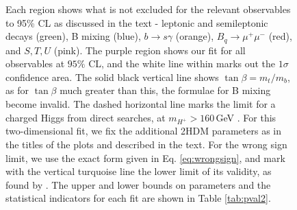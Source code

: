 \documentclass[a4paper,12pt]{article}
\begin{document}
\begin{figure}[H]
{    Each region shows what is not excluded for the relevant observables to 95\% CL as discussed in the text - leptonic and semileptonic decays (green), B mixing (blue), $b\to s\gamma$ (orange), $B_q\to\mu^+\mu^-$ (red), and $S,T,U$ (pink).
    The purple region shows our fit for all observables at $95\%$ CL, and the white line within marks out the $1\sigma$ confidence area. 
    The solid black vertical line shows $\tan\beta=m_t/m_b$, as for $\tan\beta$ much greater than this, the formulae for B mixing become invalid. 
    The dashed horizontal line marks the limit for a charged Higgs from direct searches, at $m_{H^+}>160\,$GeV \cite{dirhp}.
    For this two-dimensional fit, we fix the additional 2HDM parameters as in the titles of the plots and described in the text. 
    For the wrong sign limit, we use the exact form given in Eq. \ref{eq:wrongsign}, and mark with the vertical turquoise line the lower limit of its validity, as found by \cite{oliver}.
    The upper and lower bounds on parameters and the statistical indicators for each fit are shown in Table \ref{tab:pval2}.}
\end{figure}
\end{document}

